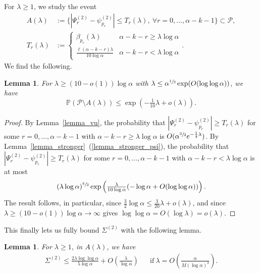 \documentclass{article}
\theoremstyle{plain}
\theoremstyle{remark}
\theoremstyle{plain}
\newtheorem{lemma}[theorem]{Lemma}
\numberwithin{equation}{section}
\begin{document}
	For $\lambda\geq1$, we study the event
	\begin{align}
		A(\lambda)&:=\{|\Psi_r^{(2)}-\psi_{p_r}^{(2)}|\leq T_r(\lambda),\ \forall r=0,\ldots,\alpha-k-1\}\subset\mathcal{P},
		\\T_r(\lambda)&:=\begin{cases}
			\beta_{p_r}(\lambda)&\alpha-k-r\geq\lambda\log\alpha
			\\\tfrac{\ell(\alpha-k-r)\lambda}{10\log\alpha}&\alpha-k-r<\lambda\log\alpha
		\end{cases}.
	\end{align}
	We find the following.
	
	\begin{lemma}\label{lemma_pai}
		For $\lambda\geq(10-o(1))\log\alpha$ with $\lambda\leq\alpha^{\sfrac12}\exp(O(\log\log\alpha))$, we have $$\mathbb{P}(\mathcal{P}\setminus A(\lambda))\leq\exp(-\tfrac1{10}\lambda+o(\lambda)).$$
	\end{lemma}
	
	\begin{proof}
		By Lemma~\ref{lemma_vu}, the probability that $|\Psi_r^{(2)}-\psi_{p_r}^{(2)}|\geq T_r(\lambda)$ for some $r=0,\ldots,\alpha-k-1$ with $\alpha-k-r\geq\lambda\log\alpha$ is $O(\alpha^{\sfrac32}e^{-\frac14\lambda})$. By Lemma~\ref{lemma_stronger}~(\ref{lemma_stronger_psi}), the probability that $|\Psi_r^{(2)}-\psi_{p_r}^{(2)}|\geq T_r(\lambda)$ for some $r=0,\ldots,\alpha-k-1$ with $\alpha-k-r<\lambda\log\alpha$ is at most $$(\lambda\log\alpha)^{\sfrac52}\exp\left(\tfrac{\lambda}{10\log\alpha}(-\log\alpha+O(\log\log\alpha))\right).$$ The result follows, in particular, since $\tfrac32\log\alpha\leq\tfrac3{20}\lambda+o(\lambda)$, and since $\lambda\geq(10-o(1))\log\alpha\to\infty$ gives $\log\log\alpha=O(\log\lambda)=o(\lambda)$.
	\end{proof}
	
	This finally lets us fully bound $\Sigma^{(2)}$ with the following lemma.
	
	\begin{lemma}\label{lemma_sai}
		For $\lambda\geq1$, in $A(\lambda)$, we have
		\begin{align}
			\Sigma^{(2)}\leq\tfrac{2\lambda\log\log\alpha}{5\log\alpha}+O\left(\tfrac{\lambda}{\log\alpha}\right)&&\text{if}\ \lambda=O\left(\tfrac{\alpha}{M(\log\alpha)^2}\right).
		\end{align}
	\end{lemma}
	
\end{document}
